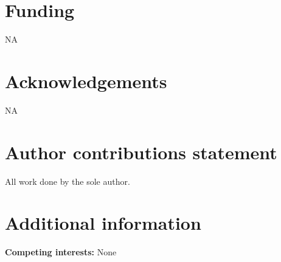 \documentclass[fleqn,10pt]{wlscirep}
\begin{document}
\section*{Funding}
NA


\section*{Acknowledgements}

NA

\section*{Author contributions statement}

All work done by the sole author.

\section*{Additional information}

\textbf{Competing interests:} None
\end{document}
